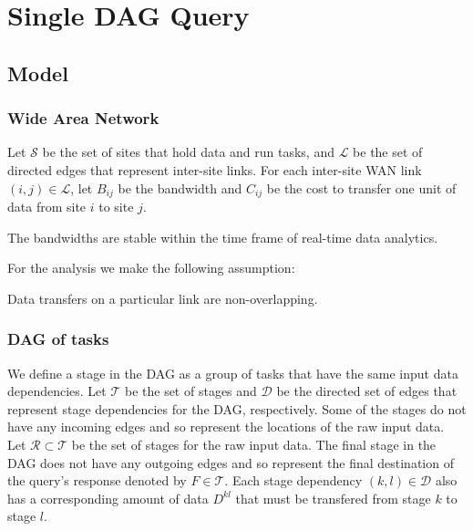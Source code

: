 \section{Single DAG Query}

\subsection{Model}

\subsubsection{Wide Area Network}

Let $\mathcal{S}$ be the set of sites that hold data and run tasks, and $\mathcal{L}$ be the set of directed edges that represent inter-site links.
For each inter-site WAN link $(i,j)\in\mathcal{L}$, let $B_{ij}$ be the bandwidth and $C_{ij}$ be the cost to transfer one unit of data from site $i$ to site $j$.
\begin{assumption}
	The bandwidths are stable within the time frame of real-time data analytics.
\end{assumption} 

For the analysis we make the following assumption:
\begin{assumption}
	Data transfers on a particular link are non-overlapping.
\end{assumption}


\subsubsection{DAG of tasks}

We define a stage in the DAG as a group of tasks that have the same input data dependencies.
Let $\mathcal{T}$ be the set of stages and $\mathcal{D}$ be the directed set of edges that represent stage dependencies for the DAG, respectively.
Some of the stages do not have any incoming edges and so represent the locations of the raw input data.
Let $\mathcal{R}\subset\mathcal{T}$ be the set of stages for the raw input data.
The final stage in the DAG does not have any outgoing edges and so represent the final destination of the query's response denoted by $F\in\mathcal{T}$.
Each stage dependency $(k,l)\in\mathcal{D}$ also has a corresponding amount of data $D^{kl}$ that must be transfered from stage $k$ to stage $l$.

